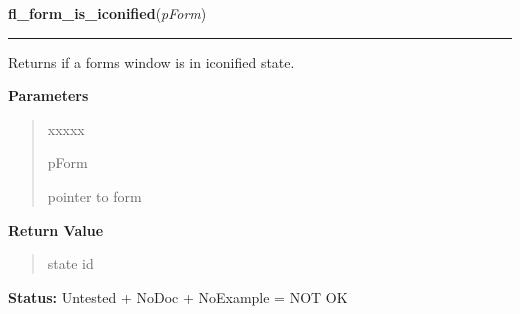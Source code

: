 \hspace{.8\funcindent}\begin{boxedminipage}{\funcwidth}

    \raggedright \textbf{fl\_form\_is\_iconified}(\textit{pForm})

    \vspace{-1.5ex}

    \rule{\textwidth}{0.5\fboxrule}
\setlength{\parskip}{2ex}
    Returns if a forms window is in iconified state.

\setlength{\parskip}{1ex}
      \textbf{Parameters}
      \vspace{-1ex}

      \begin{quote}
        \begin{Ventry}{xxxxx}

          \item[pForm]

          pointer to form

        \end{Ventry}

      \end{quote}

      \textbf{Return Value}
    \vspace{-1ex}

      \begin{quote}
      state id

      \end{quote}

\textbf{Status:} Untested + NoDoc + NoExample = NOT OK



    \end{boxedminipage}

    \label{xformslib:library:fl_register_raw_callback}

    \vspace{0.5ex}


